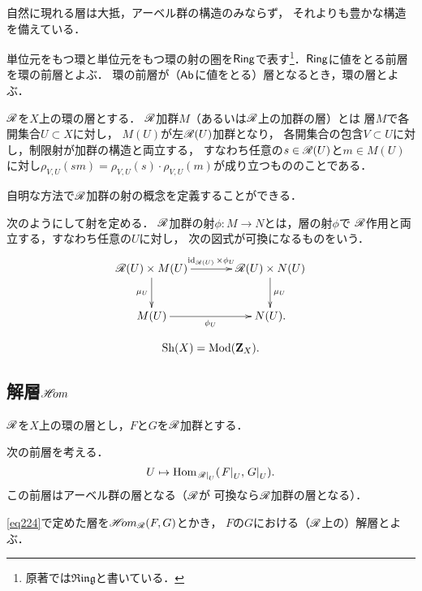 自然に現れる層は大抵，アーベル群の構造のみならず，
それよりも豊かな構造を備えている．

単位元をもつ環と単位元をもつ環の射の圏を\(\Ring\)で表す\footnote{
    原著では\(\mathfrak{Ring}\)と書いている．
}．\(\Ring\)に値をとる前層を環の前層とよぶ．
環の前層が（\(\cAb\)に値をとる）層となるとき，環の層とよぶ．

\begin{DFN}
    \(\scR\)を\(X\)上の環の層とする．
    \(\scR\)加群\(M\)（あるいは\(\scR\)上の加群の層）とは
    層\(M\)で各開集合\(U\subset X\)に対し，
    \(M(U)\)が左\(\scR(U)\)加群となり，
    各開集合の包含\(V\subset U\)に対し，制限射が加群の構造と両立する，
    すなわち任意の\(s\in\scR(U)\)と\(m\in M(U)\)に対し\(
        \rho_{V,U}(sm)=\rho_{V,U}(s)\cdot\rho_{V,U}(m)
    \)が成り立つもののことである．
\end{DFN}

自明な方法で\(\scR\)加群の射の概念を定義することができる．

\begin{CMT}
    次のようにして射を定める．
    \(\scR\)加群の射\(\phi\colon M\to N\)とは，層の射\(\phi\)で
    \(\scR\)作用と両立する，すなわち任意の\(U\)に対し，
    次の図式が可換になるものをいう．
    \[\vcenter{\xymatrix@C=36pt@R=26pt{
    \scR(U)\times M(U)
    \ar[r]^-{\id_{\scR(U)}\times\phi_U}
    \ar[d]_-{\mu_{U}}
    &
    \scR(U)\times N(U)\ar[d]^-{\mu_{U}} 
    \\
    M(U)\ar[r]_-{\phi_U}
    &
    N(U).
    }}\]
\end{CMT}
\begin{equation}
    \Sh(X)=\Mod(\zz_X).
\end{equation}
\subsection*{解層\(\HOM\)}
\(\scR\)を\(X\)上の環の層とし，\(F\)と\(G\)を\(\scR\)加群とする．

\begin{leftbar}
\begin{DFN}
    次の前層を考える．
    \begin{equation}\label{eq224}
        U\mapsto \Hom_{\mres[\scR]{U}}(\mres[F]{U},\mres[G]{U}).
    \end{equation}
    この前層はアーベル群の層となる（\(\scR\)が
    可換なら\(\scR\)加群の層となる）．

    \eqref{eq224}で定めた層を\(\HOM_{\scR}(F,G)\)とかき，
    \(F\)の\(G\)における（\(\scR\)上の）解層とよぶ．
\end{DFN}
\end{leftbar}


